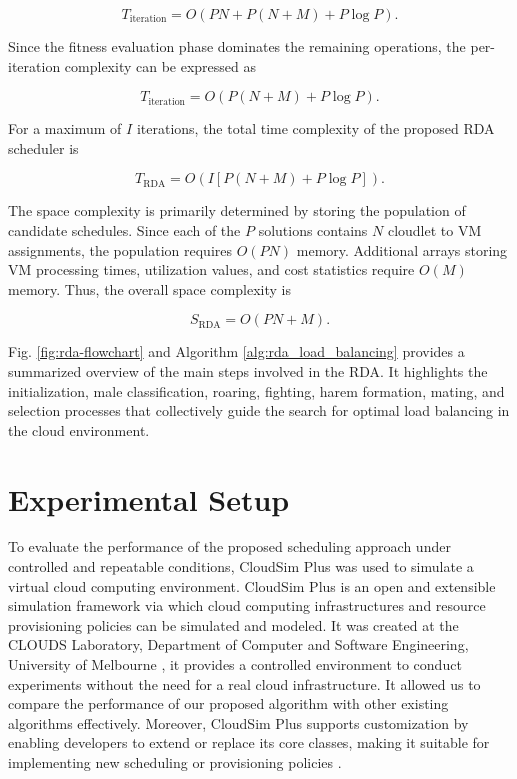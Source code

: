 \documentclass[pdflatex,sn-mathphys-num]{sn-jnl}%
\begin{document}
\begin{equation}
T_{\mathrm{iteration}} =
O\left(PN + P(N+M) + P\log P\right).
\label{eq:iteration_complexity}
\end{equation}

Since the fitness evaluation phase dominates the remaining operations, the
per-iteration complexity can be expressed as

\begin{equation}
T_{\mathrm{iteration}} =
O\left(P(N+M) + P\log P\right).
\label{eq:iteration_complexity_simplified}
\end{equation}

For a maximum of \(I\) iterations, the total time complexity of the proposed
RDA scheduler is

\begin{equation}
T_{\mathrm{RDA}} =
O\left(I\left[P(N+M)+P\log P\right]\right).
\label{eq:rda_total_complexity}
\end{equation}

The space complexity is primarily determined by storing the population of
candidate schedules. Since each of the \(P\) solutions contains \(N\)
cloudlet to VM assignments, the population requires \(O(PN)\) memory.
Additional arrays storing VM processing times, utilization values, and cost
statistics require \(O(M)\) memory. Thus, the overall space complexity is

\begin{equation}
S_{\mathrm{RDA}} = O(PN + M).
\label{eq:rda_space_complexity}
\end{equation}


Fig. \ref{fig:rda-flowchart} and Algorithm \ref{alg:rda_load_balancing} provides a summarized overview of the main steps involved in the RDA. It highlights the initialization, male classification, roaring, fighting, harem formation, mating, and selection processes that collectively guide the search for optimal load balancing in the cloud environment.

\FloatBarrier
\section{Experimental Setup}\label{sec5}

To evaluate the performance of the proposed scheduling approach under controlled and repeatable conditions, CloudSim Plus was used to simulate a virtual cloud computing environment. CloudSim Plus is an open and extensible simulation framework via which cloud computing infrastructures and resource provisioning policies can be simulated and modeled. It was created at the CLOUDS Laboratory, Department of Computer and Software Engineering, University of Melbourne \cite{cloudsim}, it provides a controlled environment to conduct experiments without the need for a real cloud infrastructure. It allowed us to compare the performance of our proposed algorithm with other existing algorithms effectively. Moreover, CloudSim Plus supports customization by enabling developers to extend or replace its core classes, making it suitable for implementing new scheduling or provisioning policies \cite{cloudsim}.
\end{document}
